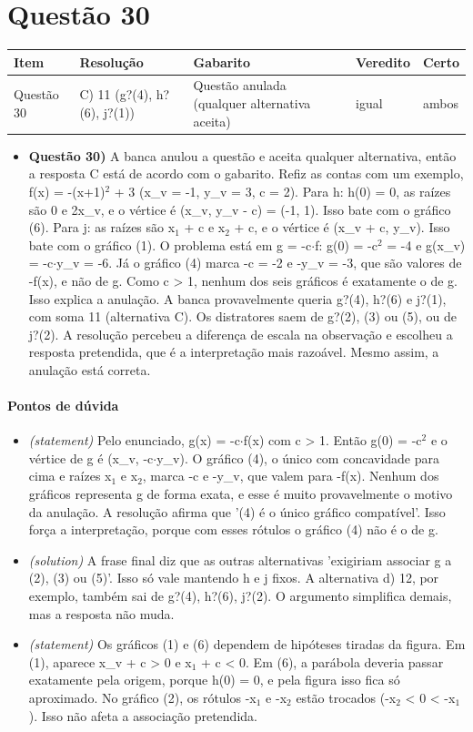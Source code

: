 \documentclass{article}%
\begin{document}
\section*{Questão 30}%
\begin{longtable}{@{}p{} p{} p{} p{} p{}@{}}\toprule Item & Resolução & Gabarito & Veredito & Certo \\ \midrule
Questão 30 & C) 11 (g?(4), h?(6), j?(1)) & Questão anulada (qualquer alternativa aceita) & igual & ambos \\
\bottomrule\end{longtable}%
\begin{itemize}%
\item%
\textbf{Questão 30)} A banca anulou a questão e aceita qualquer alternativa, então a resposta C está de acordo com o gabarito. Refiz as contas com um exemplo, f(x) = -(x+1)$^2$ + 3 (x\_v = -1, y\_v = 3, c = 2). Para h: h(0) = 0, as raízes são 0 e 2x\_v, e o vértice é (x\_v, y\_v - c) = (-1, 1). Isso bate com o gráfico (6). Para j: as raízes são x$_{1}$ + c e x$_{2}$ + c, e o vértice é (x\_v + c, y\_v). Isso bate com o gráfico (1). O problema está em g = -c$\cdot$f: g(0) = -c$^2$ = -4 e g(x\_v) = -c$\cdot$y\_v = -6. Já o gráfico (4) marca -c = -2 e -y\_v = -3, que são valores de -f(x), e não de g. Como c > 1, nenhum dos seis gráficos é exatamente o de g. Isso explica a anulação. A banca provavelmente queria g?(4), h?(6) e j?(1), com soma 11 (alternativa C). Os distratores saem de g?(2), (3) ou (5), ou de j?(2). A resolução percebeu a diferença de escala na observação e escolheu a resposta pretendida, que é a interpretação mais razoável. Mesmo assim, a anulação está correta.%
\end{itemize}%
\paragraph{Pontos de dúvida}%
\begin{itemize}%
\item%
\textit{(statement)} Pelo enunciado, g(x) = -c$\cdot$f(x) com c > 1. Então g(0) = -c$^2$ e o vértice de g é (x\_v, -c$\cdot$y\_v). O gráfico (4), o único com concavidade para cima e raízes x$_{1}$ e x$_{2}$, marca -c e -y\_v, que valem para -f(x). Nenhum dos gráficos representa g de forma exata, e esse é muito provavelmente o motivo da anulação. A resolução afirma que '(4) é o único gráfico compatível'. Isso força a interpretação, porque com esses rótulos o gráfico (4) não é o de g.%
\item%
\textit{(solution)} A frase final diz que as outras alternativas 'exigiriam associar g a (2), (3) ou (5)'. Isso só vale mantendo h e j fixos. A alternativa d) 12, por exemplo, também sai de g?(4), h?(6), j?(2). O argumento simplifica demais, mas a resposta não muda.%
\item%
\textit{(statement)} Os gráficos (1) e (6) dependem de hipóteses tiradas da figura. Em (1), aparece x\_v + c > 0 e x$_{1}$ + c < 0. Em (6), a parábola deveria passar exatamente pela origem, porque h(0) = 0, e pela figura isso fica só aproximado. No gráfico (2), os rótulos -x$_{1}$ e -x$_{2}$ estão trocados (-x$_{2}$ < 0 < -x$_{1}$). Isso não afeta a associação pretendida.%
\end{itemize}%
\end{document}
